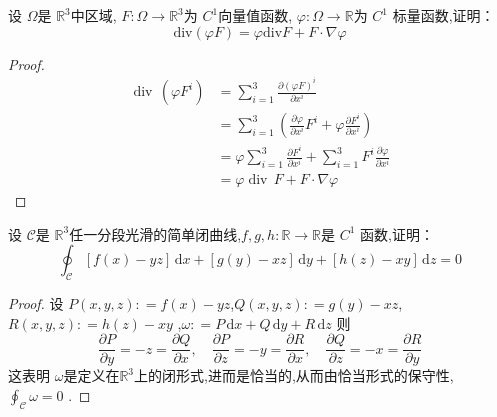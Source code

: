 \documentclass[lang=cn,12pt,color=green,fontset=none,thmcnt=section]{elegantbook}
\begin{document}
\begin{exercise}
    设 $ \Omega  $是 $ \mathbb{R} ^{3} $中区域, $ F:\Omega \to \mathbb{R} ^{3} $为 $ C^{1} $向量值函数, $ \varphi : \Omega \to \mathbb{R}  $为 $ C^{1} $ 标量函数,证明： $$
    \mathrm{div}\left( \varphi F  \right) = \varphi \mathrm{div} F+ F\cdot \nabla \varphi  
    $$
\end{exercise}

\begin{proof}
   $$
   \begin{aligned}
    \operatorname{div}\,\left( \varphi  F^{i} \right)  & = \sum _{i=1}^{3} \frac{\partial  \left( \varphi  F \right)^{i} }{\partial x^{i}} \\ 
     & = \sum _{i=1}^{3} \left(  \frac{\partial \varphi }{\partial x^{i}} F^{i}+  \varphi  \frac{\partial F^{i}}{\partial x^{i}} \right) \\ 
      & = \varphi \sum _{i=1}^{3} \frac{\partial F^{i}}{\partial x^{i}} +  \sum _{i=1}^{3}F^{i} \frac{\partial \varphi }{\partial x^{i}}\\ 
       & = \varphi \operatorname{div}\,F+  F\cdot \nabla \varphi 
   \end{aligned} 
   $$
\end{proof}
\begin{exercise}
    设 $ \mathcal{C} $是 $ \mathbb{R} ^{3} $任一分段光滑的简单闭曲线,$ f,g,h: \mathbb{R} \to \mathbb{R}  $是 $ C^{1} $    函数,证明： $$
    \oint_{\mathcal{C}}[f\left( x \right)-yz ]\,\mathrm{d} x+ [g\left( y \right)-xz ]\,\mathrm{d} y+  [h\left( z \right)-xy ]\,\mathrm{d} z = 0
    $$
\end{exercise}

\begin{proof}
    设 $ P \left( x,y,z \right): = f\left( x \right)-yz   $,$ Q\left( x,y,z \right): = g\left( y \right)-xz   $,$ R\left( x,y,z \right): = h\left( z \right)-xy   $  ,$ \omega : = P\,\mathrm{d} x+ Q\,\mathrm{d} y+ R\,\mathrm{d} z $ 则 $$
    \frac{\partial P}{\partial y}= -z = \frac{\partial Q}{\partial x},\quad  \frac{\partial P}{\partial z} = -y= \frac{\partial R}{\partial x},\quad  \frac{\partial Q}{\partial z}=-x = \frac{\partial R}{\partial y}
    $$这表明 $ \omega  $是定义在$ \mathbb{R} ^{3} $上的闭形式,进而是恰当的,从而由恰当形式的保守性, $ \oint_{\mathcal{C}} \omega =0 $   .
\end{proof}
\end{document}
